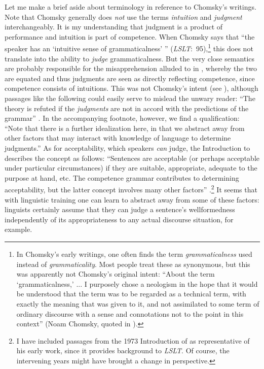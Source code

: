 Let me make a brief aside about terminology in reference to Chomsky's writings. Note that Chomsky generally does \textit{not} use the terms \textit{intuition} and \textit{judgment} interchangeably. It is my understanding that judgment is a product of performance and intuition is part of competence. When Chomsky says that ``the speaker has an `intuitive sense of grammaticalness' '' (\textit{LSLT}:~95),\footnote{In Chomsky's early writings, one often finds the term \textit{grammaticalness} used instead of \textit{grammaticality}. Most people treat these as synonymous, but this was apparently not Chomsky's original intent: ``About the term `grammaticalness,' ... I purposely chose a neologism in the hope that it would be understood that the term was to be regarded as a technical term, with exactly the meaning that was given to it, and not assimilated to some term of ordinary discourse with a sense and connotations not to the point in this context'' (Noam Chomsky, quoted in \citet[14]{Paikeday1985}).
}
this does not translate into the ability to \textit{judge} grammaticalness. But the very close semantics are probably responsible for the misapprehension alluded to in , whereby the two are equated and thus judgments are seen as directly reflecting competence, since competence consists of intuitions. This was not Chomsky's intent (see \citet[21]{Chomsky1965}), although passages like the following could easily serve to mislead the unwary reader: ``The theory is refuted if the \textit{judgments} are not in accord with the predictions of the grammar'' \citep[36]{Chomsky1985}. In the accompanying footnote, however, we find a qualification: ``Note that there is a further idealization here, in that we abstract away from other factors that may interact with knowledge of language to determine judgments.'' As for acceptability, which speakers \textit{can} judge, the Introduction to \citet{Chomsky1985} describes the concept as follows: ``Sentences are acceptable (or perhaps acceptable under particular circumstances) if they are suitable, appropriate, adequate to the purpose at hand, etc. The competence grammar contributes to determining acceptability, but the latter concept involves many other factors'' \citep[8]{Chomsky1985}.\footnote{I have included passages from the 1973 Introduction of \citet{Chomsky1985} as representative of his early work, since it provides background to \textit{LSLT}. Of course, the intervening years might have brought a change in perspective.}
It seems that with linguistic training one can learn to abstract away from some of these factors: linguists certainly assume that they can judge a sentence's wellformedness independently of its appropriateness to any actual discourse situation, for example.
 
